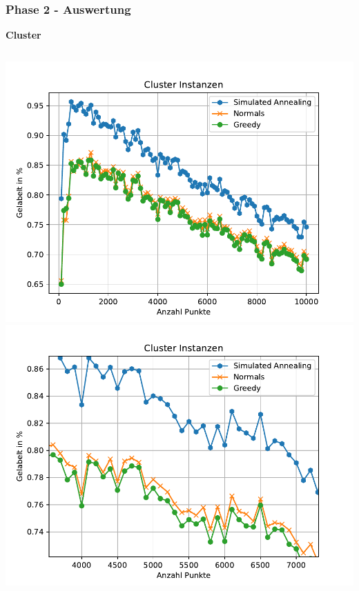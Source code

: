 \documentclass[aspectratio=169]{beamer}
\begin{document}

\begin{frame}
	\frametitle{Phase 2 - Auswertung}
	\textbf{Cluster}
	\begin{columns}[c] %
		
		\includegraphics[scale=.41]{cluster_instances.pdf}
		\includegraphics[scale=.41]{cluster_instances_detail.pdf}\\
		
	
	\end{columns}
	\end{frame}
	
\end{document}
